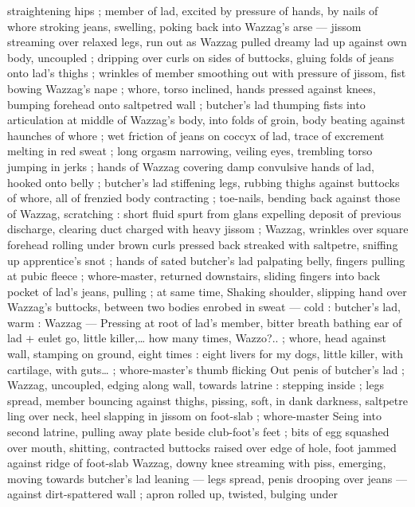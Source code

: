 {%
straightening hips ; member of lad, excited by pressure of hands, by 
nails of whore stroking jeans, swelling, poking back into Wazzag's 
arse --- jissom streaming over relaxed legs, run out as Wazzag pulled 
dreamy lad up against own body, uncoupled ; dripping over curls on 
sides of buttocks, gluing folds of jeans onto lad's thighs ; wrinkles 
of member smoothing out with pressure of jissom, fist bowing 
Wazzag's nape ; whore, torso inclined, hands pressed against knees, 
bumping forehead onto saltpetred wall ; butcher's lad thumping fists 
into articulation at middle of Wazzag's body, into folds of groin, body 
beating against haunches of whore ; wet friction of jeans on coccyx 
of lad, trace of excrement melting in red sweat ; long orgasm 
narrowing, veiling eyes, trembling torso jumping in jerks ; hands of 
Wazzag covering damp convulsive hands of lad, hooked onto belly ; 
butcher's lad stiffening legs, rubbing thighs against buttocks of 
whore, all of frenzied body contracting ; toe-nails, bending back 
against those of Wazzag, scratching : short fluid spurt from glans 
expelling deposit of previous discharge, clearing duct charged with 
heavy jissom ; Wazzag, wrinkles over square forehead rolling under 
brown curls pressed back streaked with saltpetre, sniffing up 
apprentice's snot ; hands of sated butcher's lad palpating belly, 
fingers pulling at pubic fleece ; whore-master, returned downstairs, 
sliding fingers into back pocket of lad's jeans, pulling ; at same time, 
Shaking shoulder, slipping hand over Wazzag's buttocks, between 
two bodies enrobed in sweat --- cold : butcher's lad, warm : Wazzag 
--- Pressing at root of lad's member, bitter breath bathing ear of lad 
+ eulet go, little killer,{\ldots} how many times, Wazzo?..{\gr} ; whore, head 
against wall, stamping on ground, eight times :{\td} {\gl} eight livers for my 
dogs, little killer, with cartilage, with guts{\ldots} {\gr} ; whore-master's thumb 
flicking Out penis of butcher's lad ; Wazzag, uncoupled, edging along 
wall, towards latrine : stepping inside ; legs spread, member 
bouncing against thighs, pissing, soft, in dank darkness, saltpetre 
ling over neck, heel slapping in jissom on foot-slab ; whore-master 
Seing into second latrine, pulling away plate beside club-foot's feet 
; bits of egg squashed over mouth, shitting, contracted buttocks 
raised over edge of hole, foot jammed against ridge of foot-slab 
Wazzag, downy knee streaming with piss, emerging, moving towards 
butcher's lad leaning --- legs spread, penis drooping over jeans --- 
against dirt-spattered wall ; apron rolled up, twisted, bulging under 
}

